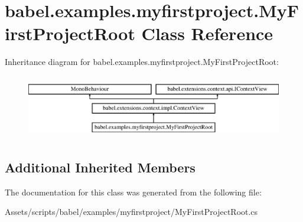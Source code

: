 \hypertarget{classbabel_1_1examples_1_1myfirstproject_1_1_my_first_project_root}{\section{babel.\-examples.\-myfirstproject.\-My\-First\-Project\-Root Class Reference}
\label{classbabel_1_1examples_1_1myfirstproject_1_1_my_first_project_root}
}
Inheritance diagram for babel.\-examples.\-myfirstproject.\-My\-First\-Project\-Root\-:\begin{figure}[H]
\begin{center}
\leavevmode
\includegraphics[height=2.809365cm]{classbabel_1_1examples_1_1myfirstproject_1_1_my_first_project_root}
\end{center}
\end{figure}
\subsection*{Additional Inherited Members}


The documentation for this class was generated from the following file\-:\begin{DoxyCompactItemize}
\item 
Assets/scripts/babel/examples/myfirstproject/My\-First\-Project\-Root.\-cs\end{DoxyCompactItemize}
